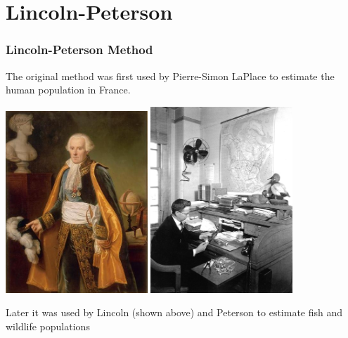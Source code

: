 \documentclass[color=usenames,dvipsnames]{beamer}\usepackage[]{graphicx}\usepackage[]{color}
\begin{document}
\section{Lincoln-Peterson}


\begin{frame}
  \frametitle{Lincoln-Peterson Method}
  The original method was first used by Pierre-Simon LaPlace to
  estimate the human population in France.   \\
  \begin{center}
    \includegraphics[width=0.4\textwidth]{figs/Laplace} \hspace{0.5cm} \pause
    \includegraphics[width=0.4\textwidth]{figs/Frederick_Charles_Lincoln}
  \end{center}
  Later it was used by Lincoln (shown above) and
  Peterson to estimate fish and wildlife populations
\end{frame}
\end{document}
